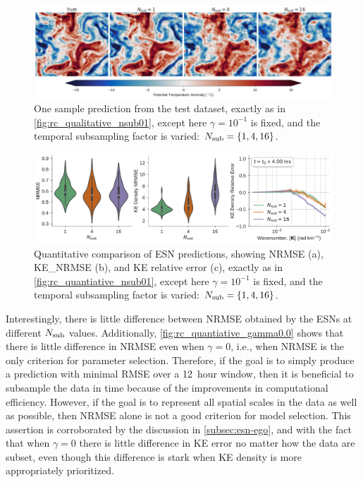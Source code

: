 \begin{figure}
    \centering
    \includegraphics[width=\textwidth]{../figures/rc_qualitative_nsub.jpg}
    \caption{One sample prediction from the test dataset, exactly as in
        \cref{fig:rc_qualitative_nsub01}, except here $\gamma=10^{-1}$ is fixed, and
        the temporal subsampling factor is varied: $N_\text{sub}=\{1,4,16\}$.
    }
    \label{fig:rc_qualitative_gamma0.1}
\end{figure}

\begin{figure}
    \centering
    \includegraphics[width=\textwidth]{../figures/rc_all_gamma0.1.pdf}
    \caption{Quantitative comparison of ESN predictions, showing
        NRMSE (a), KE\_NRMSE (b), and KE relative error (c), exactly as in
        \cref{fig:rc_quantiative_nsub01}, except here $\gamma=10^{-1}$ is fixed,
        and the temporal subsampling factor is varied: $N_\text{sub}=\{1,4,16\}$.
    }
    \label{fig:rc_quantiative_gamma0.1}
\end{figure}

Interestingly, there is little difference between NRMSE obtained by the ESNs at
different $N_\text{sub}$ values.
Additionally, \cref{fig:rc_quantiative_gamma0.0} shows that there is little
difference in NRMSE even when $\gamma=0$, i.e., when NRMSE is the only criterion
for parameter selection.
Therefore, if the goal is to simply produce a prediction with minimal RMSE over a
12~hour window, then it is beneficial to subsample the data in time because of
the improvements in computational efficiency.
However, if the goal is to represent all spatial scales in the data as well as
possible, then NRMSE alone is not a good criterion for model selection.
This assertion is corroborated by the discussion in \cref{subsec:esn-ego}, and
with the fact that when $\gamma=0$ there is little difference in KE error
no matter how the data are subset, even though this difference is stark when
KE density is more appropriately prioritized.

